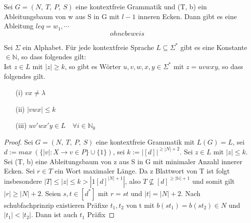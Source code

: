     Sei \(G = (N,\ T,\ P,\ S)\) eine kontextfreie Grammatik und (T, b) ein Ableitungsbaum von w aus S in G mit \(l - 1\) inneren Ecken. Dann gibt es eine Ableitung \(leq = w_1, \cdots\) 
    \[ohne beweis\]


\newpage
{}
    Sei \(\Sigma\) ein Alphabet. Für jede kontextfreie Sprache \(L \subseteq \Sigma^*\) gibt es eine Konstante \(\in \mathbb{N}\), so dass folgendes gilt:\\ Ist \(z \in L\) mit \(|z| \geq k\), so gibt es Wörter \(u, v, w, x, y \in \Sigma^*\) mit \(z = uvwxy\), so dass folgendes gilt.
    \begin{itemize}
        \item [(i)] \(vx \not = \lambda\)
        \item [(ii)]\(|vwx| \leq k\)
        \item [(iii)] \(uv'wx'y\in L \quad \forall i \in \mathbb{N}_0\)
    \end{itemize}
    \begin{proof}
            Sei \(G = (N,\ T,\ P,\ S)\) eine kontextfreie Grammatik mit \(L(G) = L\), sei \(d:=max\ (\{|v|: X \to v \in P\} \cup \{1\})\), sei \(k := |[d]|^{\geq |N| + 2}\). Sei \(z \in L\) mit \(|z|\leq k\). Sei (T, b) eine Ableitungsbaum von z aus S in G mit minimaler Anzahl innerer Ecken. Sei \(r \in T \) ein Wort maximaler Länge. Da z Blattwort von T ist folgt insbesondere \(|T| \leq |z| \leq k > |1[d]^{|N|+1}|\), also \(T \not \subseteq [d]^{\geq |\mathbb{N}|+1}\) und somit gilt \(|r|\geq |N|+2\). Seien \(s, t\in[d^*]\) mit \(r = st\) und \(|t| = |N|+2\). Nach schubfachprinzip existieren Präfixe \(t_1, t_2\) von t mit \(b(st_1) = b(st_2)\in N\) und \(|t_1|<|t_2|\). Dann ist auch \(t_1\) Präfix 
    \end{proof}
